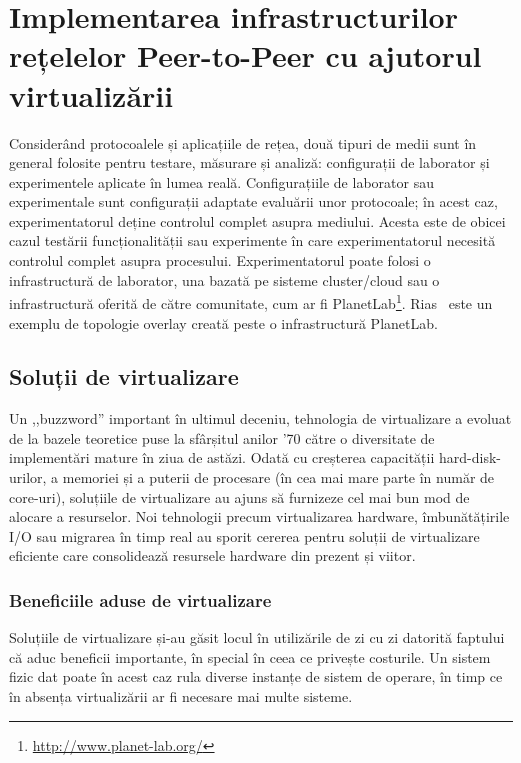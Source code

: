 
\chapter{Implementarea infrastructurilor rețelelor Peer-to-Peer cu ajutorul
virtualizării}
\label{chapter:virt-infra}

Considerând protocoalele și aplicațiile de rețea, două tipuri de medii
sunt în general folosite pentru testare, măsurare și analiză: configurații
de laborator și experimentele aplicate în lumea reală. Configurațiile
de laborator sau experimentale sunt configurații adaptate evaluării
unor protocoale; în acest caz, experimentatorul deține controlul
complet asupra mediului. Acesta este de obicei cazul testării
funcționalității sau experimente în care experimentatorul necesită controlul
complet asupra procesului. Experimentatorul poate folosi o infrastructură
de laborator, una bazată pe sisteme cluster/cloud sau o infrastructură
oferită de către comunitate, cum ar fi 
PlanetLab\footnote{\url{http://www.planet-lab.org/}}. Rias~\cite{rias} este
un exemplu de topologie overlay creată peste o infrastructură PlanetLab.

\section{Soluții de virtualizare}
\label{sec:virt-infra:openvz}

Un ,,buzzword'' important în ultimul deceniu, tehnologia de virtualizare
a evoluat de la bazele teoretice puse la sfârșitul anilor '70 către o
diversitate de implementări mature în ziua de astăzi. Odată cu creșterea
capacității hard-disk-urilor, a memoriei și a puterii de procesare
(în cea mai mare parte în număr de core-uri), soluțiile de virtualizare
au ajuns să furnizeze cel mai bun mod de alocare a resurselor. Noi
tehnologii precum virtualizarea hardware, îmbunătățirile I/O sau migrarea
în timp real au sporit cererea pentru soluții de virtualizare eficiente
care consolidează resursele hardware din prezent și viitor.

\subsection{Beneficiile aduse de virtualizare}

Soluțiile de virtualizare și-au găsit locul în utilizările de zi cu zi
datorită faptului că aduc beneficii importante, în special în ceea ce
privește costurile. Un sistem fizic dat poate în acest caz rula diverse
instanțe de sistem de operare, în timp ce în absența virtualizării ar fi
necesare mai multe sisteme.

